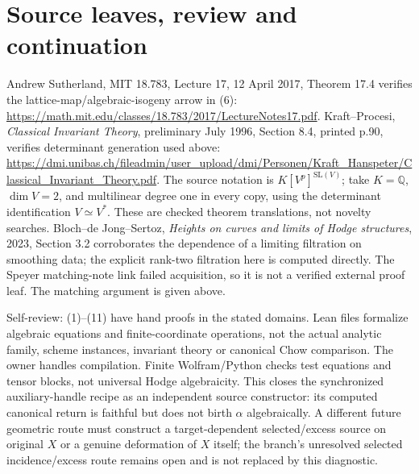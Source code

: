 \documentclass[11pt]{article}
\newcommand{\Q}{\mathbb Q}
\begin{document}
\section{Source leaves, review and continuation}
Andrew Sutherland, MIT 18.783, Lecture 17, 12 April 2017,
Theorem 17.4 verifies the lattice-map/algebraic-isogeny arrow in (6):
\url{https://math.mit.edu/classes/18.783/2017/LectureNotes17.pdf}.
Kraft--Procesi, \emph{Classical Invariant Theory}, preliminary July 1996,
Section 8.4, printed p.90, verifies determinant generation used above:
\url{https://dmi.unibas.ch/fileadmin/user_upload/dmi/Personen/Kraft_Hanspeter/Classical_Invariant_Theory.pdf}.
The source notation is $K[V^p]^{\mathrm{SL}(V)}$; take $K=\Q$,
$\dim V=2$, and multilinear degree one in every copy, using the
determinant identification $V\simeq V^*$. These are checked theorem
translations, not novelty searches. Bloch--de Jong--Sertoz,
\emph{Heights on curves and limits of Hodge structures}, 2023,
Section 3.2 corroborates the dependence of a limiting filtration on
smoothing data; the explicit rank-two filtration here is computed directly.
The Speyer matching-note link failed acquisition, so it is not a verified
external proof leaf. The matching argument is given above.

Self-review: (1)--(11) have hand proofs in the stated domains. Lean files
formalize algebraic equations and finite-coordinate operations, not the
actual analytic family, scheme instances, invariant theory or canonical
Chow comparison. The owner handles compilation. Finite Wolfram/Python
checks test equations and tensor blocks, not universal Hodge algebraicity.
This closes the synchronized auxiliary-handle recipe as an independent
source constructor: its computed canonical return is faithful but does
not birth $\alpha$ algebraically. A different future geometric route must
construct a target-dependent selected/excess source on original $X$ or
a genuine deformation of $X$ itself; the branch's unresolved selected
incidence/excess route remains open and is not replaced by this diagnostic.
\end{document}
